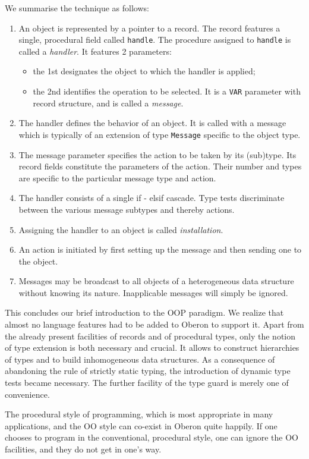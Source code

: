 We summarise the technique as follows:
\begin{enumerate}
  \item An object is represented by a pointer to a record. The record features a single, procedural field
    called \verb|handle|. The procedure assigned to \verb|handle| is called a \emph{handler}. It features
    2 parameters:
    \begin{itemize}
      \item the 1st designates the object to which the handler is applied;
      \item the 2nd identifies the operation to be selected. It is a \verb|VAR| parameter with record
        structure, and is called a \emph{message}.
    \end{itemize}
  \item The handler defines the behavior of an object. It is called with a message which is typically of
    an extension of type \verb|Message| specific to the object type.
  \item The message parameter specifies the action to be taken by its (sub)type. Its record fields
    constitute the parameters of the action. Their number and types are specific to the particular message
    type and action.
  \item The handler consists of a single if - elsif cascade. Type tests discriminate between the various
    message subtypes and thereby actions.
  \item Assigning the handler to an object is called \emph{installation}.
  \item An action is initiated by first setting up the message and then sending one to the object.
  \item Messages may be broadcast to all objects of a heterogeneous data structure without knowing its
    nature. Inapplicable messages will simply be ignored.
\end{enumerate}

This concludes our brief introduction to the OOP paradigm. We realize that almost no language features had to
be added to Oberon to support it. Apart from the already present facilities of records and of procedural types,
only the notion of type extension is both necessary and crucial. It allows to construct hierarchies of types
and to build inhomogeneous data structures. As a consequence of abandoning the rule of strictly static typing,
the introduction of dynamic type tests became necessary. The further facility of the type guard is merely one
of convenience.

The procedural style of programming, which is most appropriate in many applications, and the OO style can
co-exist in Oberon quite happily. If one chooses to program in the conventional, procedural style, one can
ignore the OO facilities, and they do not get in one’s way.
